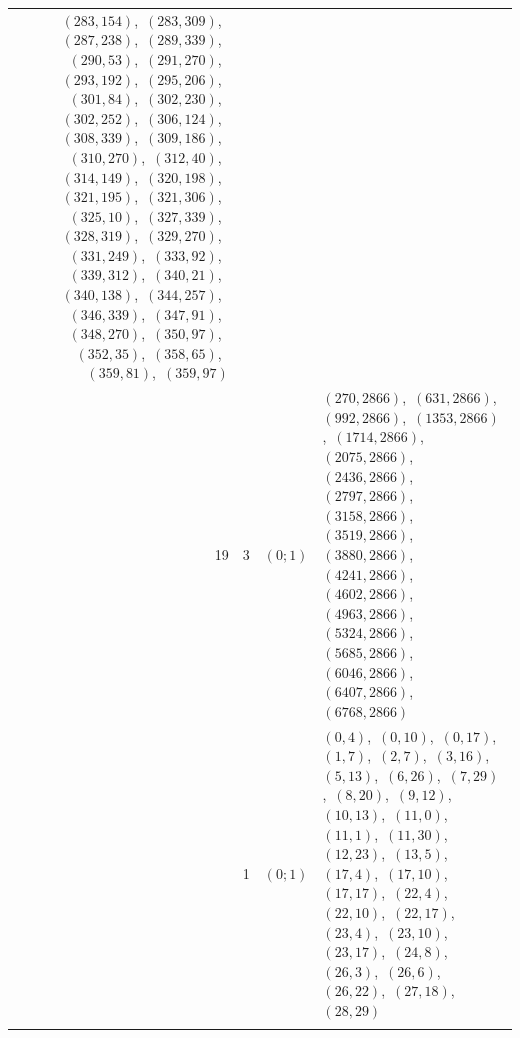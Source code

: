 \documentclass[11pt]{article}
\begin{document}
\begin{longtable}{@{}rrl>{\raggedright\arraybackslash}p{}@{}}
$(283,154)$,\allowbreak\ $(283,309)$,\allowbreak\ $(287,238)$,\allowbreak\ $(289,339)$,\allowbreak\ $(290,53)$,\allowbreak\ $(291,270)$,\allowbreak\ $(293,192)$,\allowbreak\ $(295,206)$,\allowbreak\ $(301,84)$,\allowbreak\ $(302,230)$,\allowbreak\ $(302,252)$,\allowbreak\ $(306,124)$,\allowbreak\ $(308,339)$,\allowbreak\ $(309,186)$,\allowbreak\ $(310,270)$,\allowbreak\ $(312,40)$,\allowbreak\ $(314,149)$,\allowbreak\ $(320,198)$,\allowbreak\ $(321,195)$,\allowbreak\ $(321,306)$,\allowbreak\ $(325,10)$,\allowbreak\ $(327,339)$,\allowbreak\ $(328,319)$,\allowbreak\ $(329,270)$,\allowbreak\ $(331,249)$,\allowbreak\ $(333,92)$,\allowbreak\ $(339,312)$,\allowbreak\ $(340,21)$,\allowbreak\ $(340,138)$,\allowbreak\ $(344,257)$,\allowbreak\ $(346,339)$,\allowbreak\ $(347,91)$,\allowbreak\ $(348,270)$,\allowbreak\ $(350,97)$,\allowbreak\ $(352,35)$,\allowbreak\ $(358,65)$,\allowbreak\ $(359,81)$,\allowbreak\ $(359,97)$\\
19 & 3 & $(0;1)$ & $(270,2866)$,\allowbreak\ $(631,2866)$,\allowbreak\ $(992,2866)$,\allowbreak\ $(1353,2866)$,\allowbreak\ $(1714,2866)$,\allowbreak\ $(2075,2866)$,\allowbreak\ $(2436,2866)$,\allowbreak\ $(2797,2866)$,\allowbreak\ $(3158,2866)$,\allowbreak\ $(3519,2866)$,\allowbreak\ $(3880,2866)$,\allowbreak\ $(4241,2866)$,\allowbreak\ $(4602,2866)$,\allowbreak\ $(4963,2866)$,\allowbreak\ $(5324,2866)$,\allowbreak\ $(5685,2866)$,\allowbreak\ $(6046,2866)$,\allowbreak\ $(6407,2866)$,\allowbreak\ $(6768,2866)$\\
\addlinespace[3pt]
31 & 1 & $(0;1)$ & $(0,4)$,\allowbreak\ $(0,10)$,\allowbreak\ $(0,17)$,\allowbreak\ $(1,7)$,\allowbreak\ $(2,7)$,\allowbreak\ $(3,16)$,\allowbreak\ $(5,13)$,\allowbreak\ $(6,26)$,\allowbreak\ $(7,29)$,\allowbreak\ $(8,20)$,\allowbreak\ $(9,12)$,\allowbreak\ $(10,13)$,\allowbreak\ $(11,0)$,\allowbreak\ $(11,1)$,\allowbreak\ $(11,30)$,\allowbreak\ $(12,23)$,\allowbreak\ $(13,5)$,\allowbreak\ $(17,4)$,\allowbreak\ $(17,10)$,\allowbreak\ $(17,17)$,\allowbreak\ $(22,4)$,\allowbreak\ $(22,10)$,\allowbreak\ $(22,17)$,\allowbreak\ $(23,4)$,\allowbreak\ $(23,10)$,\allowbreak\ $(23,17)$,\allowbreak\ $(24,8)$,\allowbreak\ $(26,3)$,\allowbreak\ $(26,6)$,\allowbreak\ $(26,22)$,\allowbreak\ $(27,18)$,\allowbreak\ $(28,29)$\\
\addlinespace[3pt]
\end{longtable}
\endgroup
\end{document}
